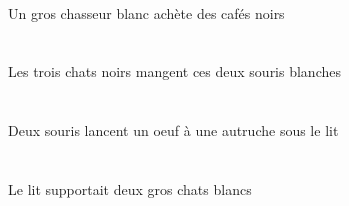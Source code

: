 \begin{exe}
   \INDSgErgG{}   \grosCSgG{}   \blancCSgG{}   \chasseurCSgErgG{}   \INDPlAbsG{}   \noirCPlG{}   \cafeCPlAbsG{}  \acheterVtPrsCPlG{} \\
 Un gros chasseur blanc achète des cafés noirs
\ex\glll
   \DEFPlErg{}   \troisDPl{}   \noirDPl{}   \chatDPlErg{}   \DEMDuAbs{}   \blancBDu{}   \sourisBDuAbs{}  \mangerVtPrsBDu{} \\
   \DEFPlErgP{}   \troisDPlP{}   \noirDPlP{}   \chatDPlErgP{}   \DEMDuAbsP{}   \blancBDuP{}   \sourisBDuAbsP{}  \mangerVtPrsBDuP{} \\
   \DEFPlErgG{}   \troisDPlG{}   \noirDPlG{}   \chatDPlErgG{}   \DEMDuAbsG{}   \blancBDuG{}   \sourisBDuAbsG{}  \mangerVtPrsBDuG{} \\
 Les trois chats noirs mangent ces deux souris blanches
\ex\glll
    \DEFSgObl{}   \litDSgObl{}   \SOUS{}   \INDDuErg{}   \sourisBDuErg{}    \INDSgDat{}   \autrucheBSgDat{}   \INDSgAbs{}   \oeufCSgAbs{}  \lancerVdPrsCSg{} \\
    \DEFSgOblP{}   \litDSgOblP{}   \SOUSP{}   \INDDuErgP{}   \sourisBDuErgP{}    \INDSgDatP{}   \autrucheBSgDatP{}   \INDSgAbsP{}   \oeufCSgAbsP{}  \lancerVdPrsCSgP{} \\
    \DEFSgOblG{}   \litDSgOblG{}   \SOUSG{}   \INDDuErgG{}   \sourisBDuErgG{}    \INDSgDatG{}   \autrucheBSgDatG{}   \INDSgAbsG{}   \oeufCSgAbsG{}  \lancerVdPrsCSgG{} \\
 Deux souris lancent un oeuf à une autruche sous le lit
\ex\glll
   \DEFSgErg{}   \litDSgErg{}   \INDDuAbs{}   \grosDDu{}   \blancDDu{}   \chatDDuAbs{}  \supporterVtPstDDu{} \\
   \DEFSgErgP{}   \litDSgErgP{}   \INDDuAbsP{}   \grosDDuP{}   \blancDDuP{}   \chatDDuAbsP{}  \supporterVtPstDDuP{} \\
   \DEFSgErgG{}   \litDSgErgG{}   \INDDuAbsG{}   \grosDDuG{}   \blancDDuG{}   \chatDDuAbsG{}  \supporterVtPstDDuG{} \\
 Le lit supportait deux gros chats blancs
\ex\glll
   \INDDuErg{}    \DEMSgObl{}   \maisonDSgObl{}   \DE{}   \chasseurCDuErg{}   \DEFPlAbs{}    \INDSgObl{}   \NicoleBSgObl{}   \DE{}   \quatreCPl{}   \oeufCPlAbs{}  \acheterVtPstCPl{} \\
   \INDDuErgP{}    \DEMSgOblP{}   \maisonDSgOblP{}   \DEP{}   \chasseurCDuErgP{}   \DEFPlAbsP{}    \INDSgOblP{}   \NicoleBSgOblP{}   \DEP{}   \quatreCPlP{}   \oeufCPlAbsP{}  \acheterVtPstCPlP{} \\
   \INDDuErgG{}    \DEMSgOblG{}   \maisonDSgOblG{}   \DEG{}   \chasseurCDuErgG{}   \DEFPlAbsG{}    \INDSgOblG{}   \NicoleBSgOblG{}   \DEG{}   \quatreCPlG{}   \oeufCPlAbsG{}  \acheterVtPstCPlG{} \\

\end{exe}
